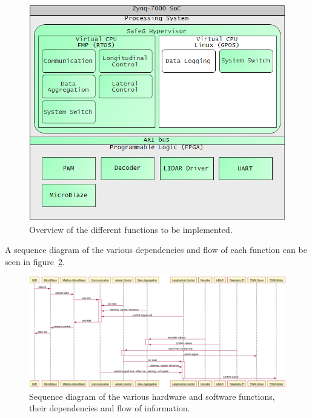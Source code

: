 \begin{figure}[H]
\centering
\includegraphics[width=\textwidth]{./img/design_overview.png}
\caption{Overview of the different functions to be implemented.}\label{fig:overview}
\end{figure}

A sequence diagram of the various dependencies and flow of each function can be seen in figure~\ref{fig:sequence}.

\begin{figure}[H]
\centering
\includegraphics[width=\textwidth]{./img/design_sequence3.png}
\caption{Sequence diagram of the various hardware and software functions, their dependencies and flow of information.}\label{fig:sequence}
\end{figure}



